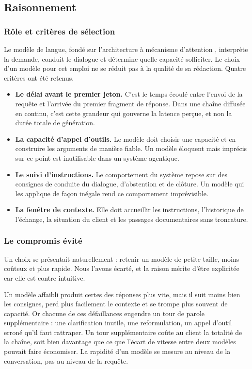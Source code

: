 \subsection{Raisonnement}

\subsubsection{Rôle et critères de sélection}

Le modèle de langue, fondé sur l'architecture à mécanisme d'attention \cite{vaswani}, interprète la demande, conduit le dialogue et détermine quelle capacité solliciter. Le choix d'un modèle pour cet emploi ne se réduit pas à la qualité de sa rédaction. Quatre critères ont été retenus.

\begin{itemize}
  \item \textbf{Le délai avant le premier jeton.} C'est le temps écoulé entre l'envoi de la requête et l'arrivée du premier fragment de réponse. Dans une chaîne diffusée en continu, c'est cette grandeur qui gouverne la latence perçue, et non la durée totale de génération.
  \item \textbf{La capacité d'appel d'outils.} Le modèle doit choisir une capacité et en construire les arguments de manière fiable. Un modèle éloquent mais imprécis sur ce point est inutilisable dans un système agentique.
  \item \textbf{Le suivi d'instructions.} Le comportement du système repose sur des consignes de conduite du dialogue, d'abstention et de clôture. Un modèle qui les applique de façon inégale rend ce comportement imprévisible.
  \item \textbf{La fenêtre de contexte.} Elle doit accueillir les instructions, l'historique de l'échange, la situation du client et les passages documentaires sans troncature.
\end{itemize}

\subsubsection{Le compromis évité}

Un choix se présentait naturellement : retenir un modèle de petite taille, moins coûteux et plus rapide. Nous l'avons écarté, et la raison mérite d'être explicitée car elle est contre intuitive.

Un modèle affaibli produit certes des réponses plus vite, mais il suit moins bien les consignes, perd plus facilement le contexte et se trompe plus souvent de capacité. Or chacune de ces défaillances engendre un tour de parole supplémentaire : une clarification inutile, une reformulation, un appel d'outil erroné qu'il faut rattraper. Un tour supplémentaire coûte au client la totalité de la chaîne, soit bien davantage que ce que l'écart de vitesse entre deux modèles pouvait faire économiser. La rapidité d'un modèle se mesure au niveau de la conversation, pas au niveau de la requête.

